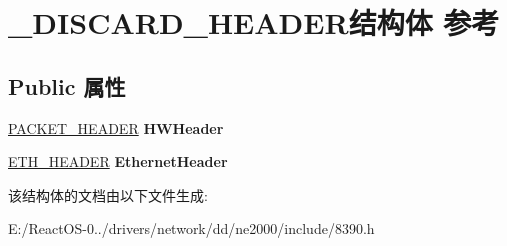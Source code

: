 \hypertarget{struct___d_i_s_c_a_r_d___h_e_a_d_e_r}{}\section{\+\_\+\+D\+I\+S\+C\+A\+R\+D\+\_\+\+H\+E\+A\+D\+E\+R结构体 参考}
\label{struct___d_i_s_c_a_r_d___h_e_a_d_e_r}
\subsection*{Public 属性}
\begin{DoxyCompactItemize}
\item 
\mbox{\label{struct___d_i_s_c_a_r_d___h_e_a_d_e_r_acbcbf05087cddcaa22dc8228004fcad4}} 
\hyperlink{struct___p_a_c_k_e_t___h_e_a_d_e_r}{P\+A\+C\+K\+E\+T\+\_\+\+H\+E\+A\+D\+ER} {\bfseries H\+W\+Header}
\item 
\mbox{\label{struct___d_i_s_c_a_r_d___h_e_a_d_e_r_a4f33c3b3f3e4b881e299dfd1efeb7d10}} 
\hyperlink{struct_e_t_h___h_e_a_d_e_r}{E\+T\+H\+\_\+\+H\+E\+A\+D\+ER} {\bfseries Ethernet\+Header}
\end{DoxyCompactItemize}


该结构体的文档由以下文件生成\+:\begin{DoxyCompactItemize}
\item 
E\+:/\+React\+O\+S-\/0../drivers/network/dd/ne2000/include/8390.\+h\end{DoxyCompactItemize}

